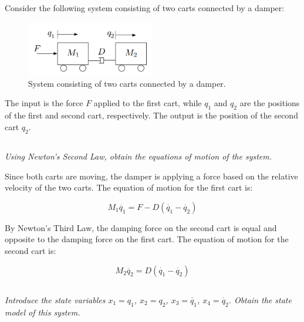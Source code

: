 \section{}
Consider the following system consisting of two carts connected by a damper:
\begin{figure}[h]
    \centering
    \includegraphics[width=0.5\textwidth]{Questions/Figures/Q2ProblemDiagram.png}
    \caption{System consisting of two carts connected by a damper.}
    \label{fig:Q2 System}
\end{figure}

The input is the force $F$ applied to the first cart, while $q_1$ and $q_2$ are the positions of the first and second cart, 
respectively. The output is the position of the second cart $q_2$.

\subsection{}
\textit{Using Newton’s Second Law, obtain the equations of motion of the system.}


Since both carts are moving, the damper is applying a force based on the relative velocity of the two carts. The equation of motion for the first cart is:

\begin{equation}
    \boxed{M_1\ddot{q_1} = F - D(\dot{q_1} - \dot{q_2})} \nonumber
\end{equation}

By Newton's Third Law, the damping force on the second cart is equal and opposite to the damping force on the first cart. The equation of motion for the second cart is:

\begin{equation}
    \boxed{M_2\ddot{q_2} = D(\dot{q_1} - \dot{q_2})} \nonumber
\end{equation}

\subsection{}
\textit{Introduce the state variables $x_1 = q_1$, $x_2 = q_2$, $x_3 = \dot{q_1}$, $x_4 = \dot{q_2}$. Obtain the state model of this system.}

